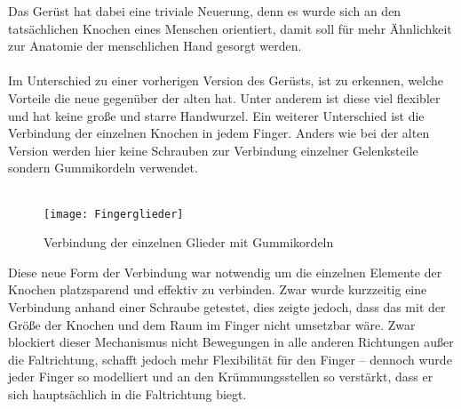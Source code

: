 \documentclass[titlepage,12pt,twoside]{article}
\begin{document}
\hfill \break
Das Gerüst hat dabei eine triviale Neuerung, denn es wurde sich an den tatsächlichen Knochen eines Menschen orientiert, damit soll für mehr Ähnlichkeit zur Anatomie der menschlichen Hand gesorgt werden. \\
\\
Im Unterschied zu einer vorherigen Version des Gerüsts, ist zu erkennen, welche Vorteile die neue gegenüber der alten hat. Unter anderem ist diese viel flexibler und hat keine große und starre Handwurzel. 
Ein weiterer Unterschied ist die Verbindung der einzelnen Knochen in jedem Finger. Anders wie bei der alten Version werden hier keine Schrauben zur Verbindung einzelner Gelenksteile sondern Gummikordeln verwendet. \\
\\
\begin{figure}[H]
	\begin{center}
		\scalebox{0.5}
		{\texttt{[image: Fingerglieder]}}
		\caption{Verbindung der einzelnen Glieder mit Gummikordeln}
		\label{fig:Fingerglieder}			
	\end{center}
\end{figure}
\hfill \break
Diese neue Form der Verbindung war notwendig um die einzelnen Elemente der Knochen platzsparend und effektiv zu verbinden. Zwar wurde kurzzeitig eine Verbindung anhand einer Schraube getestet, dies zeigte jedoch, dass das mit der Größe der Knochen 
und dem Raum im Finger nicht umsetzbar wäre. Zwar blockiert dieser Mechanismus nicht Bewegungen in alle anderen Richtungen außer die Faltrichtung, schafft jedoch mehr Flexibilität für den Finger – dennoch wurde jeder Finger so modelliert und an den 
Krümmungsstellen so verstärkt, dass er sich hauptsächlich in die Faltrichtung biegt. \\
\\
\end{document}
